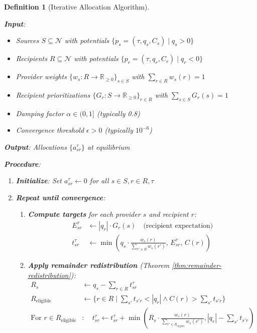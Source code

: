 \documentclass[11pt]{article}
\newtheorem{definition}{Definition}
\begin{document}
\begin{definition}[Iterative Allocation Algorithm]
\label{alg:iterative-convergence}

\textbf{Input}: 
\begin{itemize}
\item Sources $S \subseteq \mathcal{N}$ with potentials $\{p_s = (\tau, q_s, C_s) \mid q_s > 0\}$
\item Recipients $R \subseteq \mathcal{N}$ with potentials $\{p_r = (\tau, q_r, C_r) \mid q_r < 0\}$
\item Provider weights $\{w_s: R \to \mathbb{R}_{\geq 0}\}_{s \in S}$ with $\sum_{r \in R} w_s(r) = 1$
\item Recipient prioritizations $\{G_r: S \to \mathbb{R}_{\geq 0}\}_{r \in R}$ with $\sum_{s \in S} G_r(s) = 1$
\item Damping factor $\alpha \in (0,1]$ (typically 0.8)
\item Convergence threshold $\epsilon > 0$ (typically $10^{-6}$)
\end{itemize}

\textbf{Output}: Allocations $\{a_{sr}^\tau\}$ at equilibrium

\textbf{Procedure}:
\begin{enumerate}
\item \textbf{Initialize}: Set $a_{sr}^\tau \leftarrow 0$ for all $s \in S, r \in R, \tau$

\item \textbf{Repeat until convergence}:
  \begin{enumerate}
  \item \textbf{Compute targets} for each provider $s$ and recipient $r$:
  \begin{align*}
  E_{sr}^\tau &\leftarrow |q_r| \cdot G_r(s) \quad \text{(recipient expectation)} \\
  t_{sr}^\tau &\leftarrow \min\left( q_s \cdot \frac{w_s(r)}{\sum_{r' \in R} w_s(r')}, \, E_{sr}^\tau, \, C(r) \right)
  \end{align*}
  
  \item \textbf{Apply remainder redistribution} (Theorem \ref{thm:remainder-redistribution}):
  \begin{align*}
  R_s &\leftarrow q_s - \sum_{r \in R} t_{sr}^\tau \\
  R_{\text{eligible}} &\leftarrow \{ r \in R \mid \sum_{s'} t_{s'r} < |q_r| \land C(r) > \sum_{s'} t_{s'r} \} \\
  \text{For } r \in R_{\text{eligible}}&: \quad t_{sr}^\tau \leftarrow t_{sr}^\tau + \min\left( R_s \cdot \frac{w_s(r)}{\sum_{r' \in R_{\text{eligible}}} w_s(r')}, |q_r| - \sum_{s'} t_{s'r} \right)
  \end{align*}
  

\end{enumerate}
\end{enumerate}
\end{definition}
\end{document}
